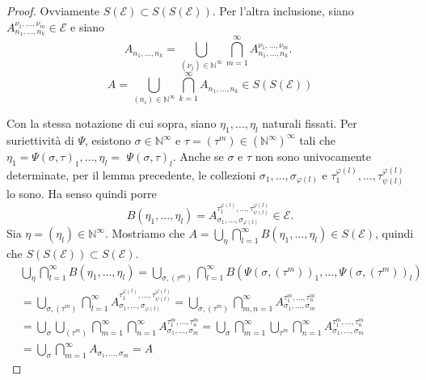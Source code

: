 \documentclass[a4paper, twoside,openright]{article}
\newcommand{\N}{\mathbb{N}}
\newcommand{\<}{\langle}
\renewcommand{\>}{\rangle}
\begin{document}
\begin{proof}
	Ovviamente $S(\mathcal{E}) \subset S(S(\mathcal{E}))$. Per l'altra inclusione, siano $A_{n_{1}, \ldots, n_{k}}^{\nu_{1}, \ldots, \nu_{m}} \in \mathcal{E}$ e siano
	$$ A_{n_{1}, \ldots, n_{k}}=\bigcup_{(\nu_j) \in \mathbb{N}^{\infty}} \bigcap_{m=1}^{\infty} A_{n_{1}, \ldots, n_{k}}^{\nu_{1}, \ldots, \nu_{m}} \text {. }	$$
	$$	A=\bigcup_{\left(n_{i}\right) \in \mathbb{N}^{\infty}} \bigcap_{k=1}^{\infty} A_{n_{1}, \ldots, n_{k}} \in S(S(\mathcal{E}))$$
	
	Con la stessa notazione di cui sopra, siano $\eta_{1}, \ldots, \eta_{l}$ naturali fissati. Per suriettività di $\Psi$, esistono $\sigma \in \mathbb{N}^{\infty}$ e $\tau=\left(\tau^{m}\right) \in\left(\mathbb{N}^{\infty}\right)^{\infty}$ tali che $\eta_{1}=\Psi(\sigma, \tau)_{1}, \ldots, \eta_{l}=$ $\Psi(\sigma, \tau)_{l}$. Anche se $\sigma$ e $\tau$ non sono univocamente determinate, per il lemma precedente, le collezioni $\sigma_{1}, \ldots, \sigma_{\varphi(l)}$ e $\tau_{1}^{\varphi(l)}, \ldots, \tau_{\psi(l)}^{\varphi(l)}$ lo sono. Ha senso quindi porre
	$$
	B\left(\eta_{1}, \ldots, \eta_{l}\right)=A_{\sigma_{1}, \ldots, \sigma_{\varphi(l)}}^{\tau_{1}^{\varphi(l)}, \ldots, \tau_{\psi(l)}^{\varphi(l)}} \in \mathcal{E} .
	$$
	Sia $\eta=\left(\eta_{l}\right)\in \N^{\infty}$. Mostriamo che $A=\bigcup_{\eta} \bigcap_{l=1}^{\infty} B\left(\eta_{1}, \ldots, \eta_{l}\right) \in S(\mathcal{E})$, quindi che $S(S(\mathcal{E})) \subset S(\mathcal{E})$.
	$$
	\begin{aligned}
		&\bigcup_{\eta} \bigcap_{l=1}^{\infty} B\left(\eta_{1}, \ldots, \eta_{l}\right)=\bigcup_{\sigma,\left(\tau^{m}\right)} \bigcap_{l=1}^{\infty} B\left(\Psi\left(\sigma,\left(\tau^{m}\right)\right)_{1}, \ldots, \Psi\left(\sigma,\left(\tau^{m}\right)\right)_{l}\right) \\
		&=\bigcup_{\sigma,\left(\tau^{m}\right)} \bigcap_{l=1}^{\infty} A_{\sigma_{1}, \ldots, \sigma_{\varphi(l)}}^{\tau_{1}^{\varphi(l)}, \ldots, \tau_{\psi(l)}^{\varphi(l)}}=\bigcup_{\sigma,\left(\tau^{m}\right)} \bigcap_{m, n=1}^{\infty} A_{\sigma_{1}, \ldots, \sigma_{m}}^{\tau_{1}^{m}, \ldots, \tau_{n}^{m}} \\
		&=\bigcup_{\sigma} \bigcup_{\left(\tau^{m}\right)} \bigcap_{m=1}^{\infty} \bigcap_{n=1}^{\infty} A_{\sigma_{1}, \ldots, \sigma_{m}}^{\tau_{1}^{m}, \ldots, \tau_{n}^{m}}=\bigcup_{\sigma} \bigcap_{m=1}^{\infty} \bigcup_{\tau^{m}} \bigcap_{n=1}^{\infty} A_{\sigma_{1}, \ldots, \sigma_{m}}^{\tau_{1}^{m}, \ldots, \tau_{n}^{m}} \\
		&=\bigcup_{\sigma} \bigcap_{m=1}^{\infty} A_{\sigma_{1}, \ldots, \sigma_{m}}=A

\end{aligned}$$
\end{proof}
\end{document}
